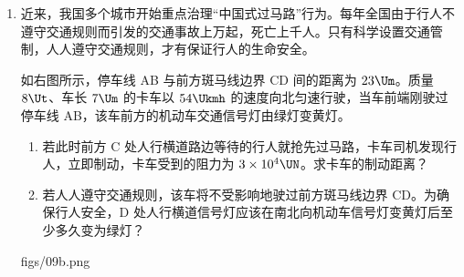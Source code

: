 \documentclass[\gkver]{gaokaozhenti}
\begin{document}
\begin{enumerate}
\begin{enumerate}



\end{enumerate}


\item
近来，我国多个城市开始重点治理“中国式过马路”行为。每年全国由于行人不遵守交通规则而引发的交通事故上万起，死亡上千人。只有科学设置交通管制，人人遵守交通规则，才有保证行人的生命安全。

如右图所示，停车线 AB 与前方斑马线边界 CD 间的距离为 $23\Um$。质量 $8\Ut$、车长 $7\Um$ 的卡车以 $54\Ukmh$ 的速度向北匀速行驶，当车前端刚驶过停车线 AB，该车前方的机动车交通信号灯由绿灯变黄灯。
\begin{enumerate}
	\item
	若此时前方 C 处人行横道路边等待的行人就抢先过马路，卡车司机发现行人，立即制动，卡车受到的阻力为 $3\times10^{4}\UN$。求卡车的制动距离？
	\item
	若人人遵守交通规则，该车将不受影响地驶过前方斑马线边界 CD。为确保行人安全，D 处人行横道信号灯应该在南北向机动车信号灯变黄灯后至少多久变为绿灯？
\end{enumerate}

{figs/09b.png}

\jdanswer{
\begin{enumerate}
	\item
	$30\Um$


\end{enumerate}}
\end{enumerate}
\end{document}
